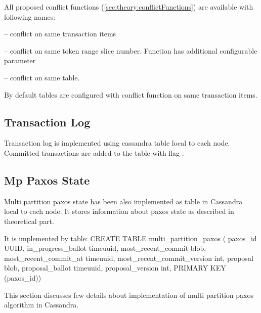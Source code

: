 
All proposed conflict functions (\ref{sec:theory:conflictFunctions}) are available with following names:
\begin{enumerate*}
\item {} -- conflict on same transaction items
\item {} -- conflict on same token range slice number. Function has additional configurable parameter 
\item {} -- conflict on same table.
\end{enumerate*}
By default tables are configured with conflict function on same transaction items.


\subsection{Transaction Log}
Transaction log is implemented using cassandra table local to each node. 
Committed transactions are added to the table with flag . 


\subsection{Mp Paxos State}
Multi partition paxos state has been also implemented as table in Cassandra local to each node. It stores information about paxos state as described in theoretical part.


It is implemented by table:
CREATE TABLE multi_partition_paxos (
paxos_id UUID,
in_progress_ballot timeuuid,
most_recent_commit blob,
most_recent_commit_at timeuuid,
most_recent_commit_version int,
proposal blob,
proposal_ballot timeuuid,
proposal_version int,
PRIMARY KEY (paxos_id))




This section discusses few details about implementation of multi partition paxos algorithm in Cassandra.

